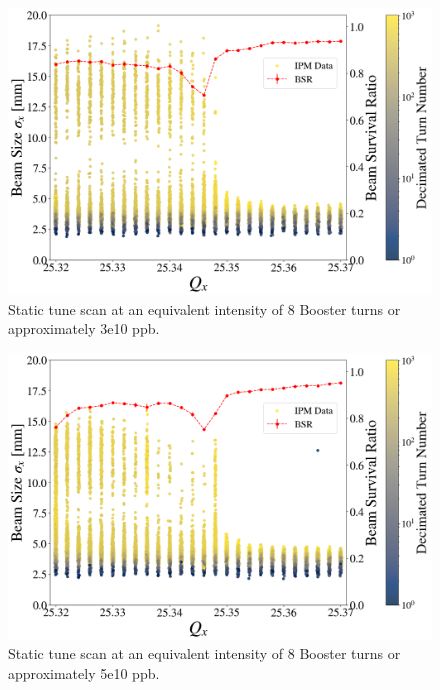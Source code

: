 \begin{figure}[H]
    \centering
    \includegraphics[width=\columnwidth]{chapter6/static8turns_dampersOFF.png}
    \caption{Static tune scan at an equivalent intensity of 8 Booster turns or approximately 3e10 ppb.}
    \label{fig:static8_scatter}
\end{figure}

\begin{figure}[H]
    \centering
    \includegraphics[width=\columnwidth]{chapter6/static14turns_dampersOFF.png}
    \caption{Static tune scan at an equivalent intensity of 8 Booster turns or approximately 5e10 ppb.}
    \label{fig:static14}
\end{figure}


